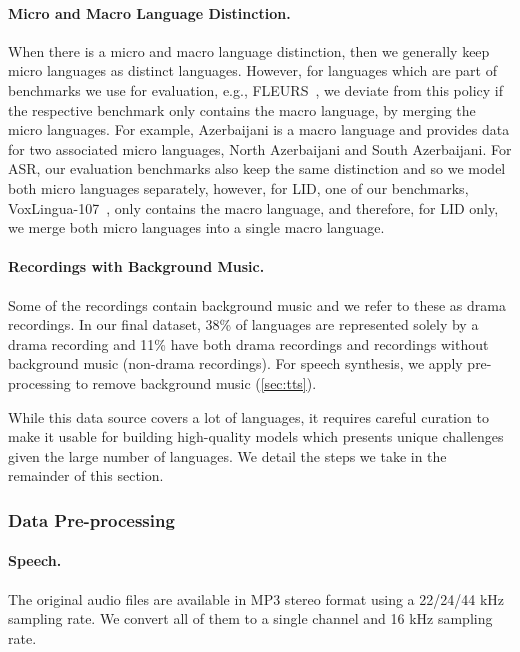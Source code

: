 \paragraph{Micro and Macro Language Distinction.}
When there is a micro and macro language distinction, then we generally keep micro languages as distinct languages. 
However, for languages which are part of benchmarks we use for evaluation, e.g., FLEURS~\citep{conneau2022fleurs}, we deviate from this policy if the respective benchmark only contains the macro language, by merging the micro languages.
For example, Azerbaijani is a macro language and \MMS{} provides data for two associated micro languages, North Azerbaijani and South Azerbaijani.
For ASR, our evaluation benchmarks also keep the same distinction and so we model both micro languages separately, however, for LID, one of our benchmarks, VoxLingua-107~\citep{valk2020voxlingua}, only contains the macro language, and therefore, for LID only, we merge both micro languages into a single macro language.



\paragraph{Recordings with Background Music.}
Some of the recordings contain background music and we refer to these as drama recordings.
In our final \MMS{} dataset, 38\% of languages are represented solely by a drama recording and 11\% have both drama recordings and recordings without background music (non-drama recordings).
For speech synthesis, we apply pre-processing to remove background music (\textsection\ref{sec:tts}).

While this data source covers a lot of languages, it requires careful curation to make it usable for building high-quality models which presents unique challenges given the large number of languages. 
We detail the steps we take in the remainder of this section.


\subsubsection{Data Pre-processing}
\label{sec:data-preprocess}


\paragraph{Speech.}
The original audio files are available in MP3 stereo format using a 22/24/44 kHz sampling rate. 
We convert all of them to a single channel and 16 kHz sampling rate. 

